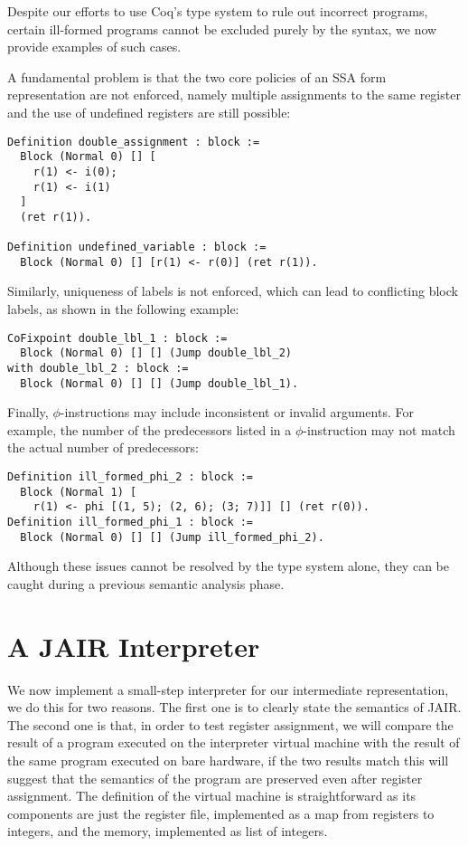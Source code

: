 Despite our efforts to use Coq's type system to rule out incorrect programs, certain ill-formed programs cannot be excluded purely by the syntax, we now provide examples of such cases.

A fundamental problem is that the two core policies of an SSA form representation are not enforced, namely multiple assignments to the same register and the use of undefined registers are still possible:

\begin{lstlisting}[style=Coq]
Definition double_assignment : block :=
  Block (Normal 0) [] [
    r(1) <- i(0);
    r(1) <- i(1)
  ]
  (ret r(1)).

Definition undefined_variable : block :=
  Block (Normal 0) [] [r(1) <- r(0)] (ret r(1)).
\end{lstlisting}

Similarly, uniqueness of labels is not enforced, which can lead to conflicting block labels, as shown in the following example:

\begin{lstlisting}[style=Coq]
CoFixpoint double_lbl_1 : block :=
  Block (Normal 0) [] [] (Jump double_lbl_2)
with double_lbl_2 : block :=
  Block (Normal 0) [] [] (Jump double_lbl_1).
\end{lstlisting}

Finally, $\phi$-instructions may include inconsistent or invalid arguments. For example, the number of the predecessors listed in a $\phi$-instruction may not match the actual number of predecessors:

\begin{lstlisting}[style=Coq]
Definition ill_formed_phi_2 : block :=
  Block (Normal 1) [
    r(1) <- phi [(1, 5); (2, 6); (3; 7)]] [] (ret r(0)).
Definition ill_formed_phi_1 : block :=
  Block (Normal 0) [] [] (Jump ill_formed_phi_2).
\end{lstlisting}

Although these issues cannot be resolved by the type system alone, they can be caught during a previous semantic analysis phase.

\section{A JAIR Interpreter}
\label{sec:jair-int}

We now implement a small-step interpreter for our intermediate representation, we do this for two reasons.
The first one is to clearly state the semantics of JAIR. The second one is that, in order to test register assignment, we will compare the result of a program executed on the interpreter virtual machine with the result of the same program executed on bare hardware, if the two results match this will suggest that the semantics of the program are preserved even after register assignment.
The definition of the virtual machine is straightforward as its components are just the register file, implemented as a map from registers to integers, and the memory, implemented as list of integers.

